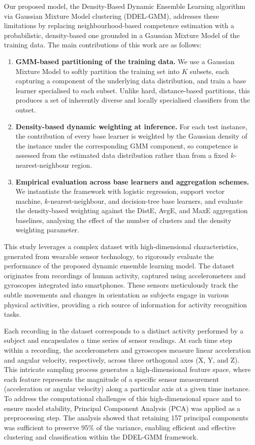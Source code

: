 \documentclass[lettersize,journal]{IEEEtran}
\begin{document}
	Our proposed model, the Density-Based Dynamic Ensemble Learning algorithm via Gaussian Mixture Model clustering (DDEL-GMM), addresses these limitations by replacing neighbourhood-based competence estimation with a probabilistic, density-based one grounded in a Gaussian Mixture Model of the training data. The main contributions of this work are as follows:
	\begin{enumerate}
		\item \textbf{GMM-based partitioning of the training data.} We use a Gaussian Mixture Model to softly partition the training set into $K$ subsets, each capturing a component of the underlying data distribution, and train a base learner specialised to each subset. Unlike hard, distance-based partitions, this produces a set of inherently diverse and locally specialised classifiers from the outset.
		\item \textbf{Density-based dynamic weighting at inference.} For each test instance, the contribution of every base learner is weighted by the Gaussian density of the instance under the corresponding GMM component, so competence is assessed from the estimated data distribution rather than from a fixed $k$-nearest-neighbour region.
		\item \textbf{Empirical evaluation across base learners and aggregation schemes.} We instantiate the framework with logistic regression, support vector machine, $k$-nearest-neighbour, and decision-tree base learners, and evaluate the density-based weighting against the DistE, AvgE, and MaxE aggregation baselines, analysing the effect of the number of clusters and the density weighting parameter.
	\end{enumerate}
	
	This study leverages a complex dataset with high-dimensional characteristics, generated from wearable sensor technology, to rigorously evaluate the performance of the proposed dynamic ensemble learning model. The dataset originates from recordings of human activity, captured using accelerometers and gyroscopes integrated into smartphones. These sensors meticulously track the subtle movements and changes in orientation as subjects engage in various physical activities, providing a rich source of information for activity recognition tasks.
	
	Each recording in the dataset corresponds to a distinct activity performed by a subject and encapsulates a time series of sensor readings. At each time step within a recording, the accelerometers and gyroscopes measure linear acceleration and angular velocity, respectively, across three orthogonal axes (X, Y, and Z). This intricate sampling process generates a high-dimensional feature space, where each feature represents the magnitude of a specific sensor measurement (acceleration or angular velocity) along a particular axis at a given time instance. To address the computational challenges of this high-dimensional space and to ensure model stability, Principal Component Analysis (PCA) was applied as a preprocessing step. The analysis showed that retaining 157 principal components was sufficient to preserve 95\% of the variance, enabling efficient and effective clustering and classification within the DDEL-GMM framework.
\end{document}
